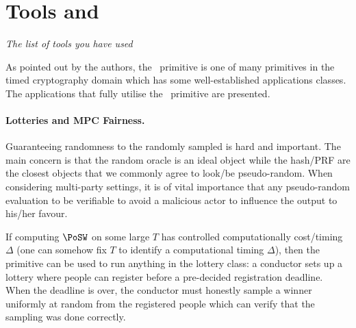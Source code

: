 
\section{Tools and }\label{sec:applications}

\begin{center}
	\itshape The list of tools you have used
\end{center}

As pointed out by the authors, the \PoSW\ primitive is one of many primitives in the
timed cryptography domain which has some well-established applications classes.
The applications that fully utilise the \PoSW\ primitive are presented.

\vspace{2mm}



\paragraph{Lotteries and MPC Fairness.}
	Guaranteeing randomness to the randomly sampled is hard and important.
	The main concern is that the random oracle is an ideal object while the hash/PRF are the closest
	objects that we commonly agree to look/be pseudo-random.
	When considering multi-party settings, it is of vital importance that any pseudo-random evaluation
	to be verifiable to avoid a malicious actor to influence the output to his/her favour.
	
	If computing $\PoSW$ on some large $T$ has controlled computationally cost/timing $\Delta$
	(one can somehow fix $T$ to identify a computational timing $\Delta$), then the primitive can be
	used to run anything in the lottery class:
	a conductor sets up a lottery where people can register before a pre-decided registration deadline.
	When the deadline is over, the conductor must honestly sample a winner uniformly at random from the
	registered people which can verify that the sampling was done correctly.
	
